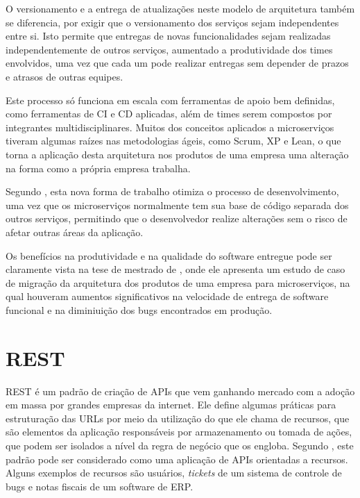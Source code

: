 O versionamento e a entrega de atualizações neste modelo de arquitetura
também se diferencia, por exigir que o versionamento dos serviços sejam
independentes entre si. Isto permite que entregas de novas funcionalidades
sejam realizadas independentemente de outros serviços, aumentado a
produtividade dos times envolvidos, uma vez que cada um pode realizar entregas
sem depender de prazos e atrasos de outras equipes.

Este processo só funciona em escala com ferramentas de apoio bem definidas,
como ferramentas de \ac{CI} e \ac{CD} aplicadas, além de times serem compostos
por integrantes multidisciplinares. Muitos dos conceitos aplicados a
microserviços tiveram algumas raízes nas metodologias ágeis, como Scrum, XP e
Lean, o que torna a aplicação desta arquitetura nos produtos de uma empresa
uma alteração na forma como a própria empresa trabalha.

Segundo , esta nova forma de trabalho otimiza o processo
de desenvolvimento, uma vez que os microserviços normalmente tem sua base de
código separada dos outros serviços, permitindo que o desenvolvedor realize
alterações sem o risco de afetar outras áreas da aplicação.

Os benefícios na produtividade e na qualidade do software entregue pode
ser claramente vista na tese de mestrado de , onde
ele apresenta um estudo de caso de migração da arquitetura dos produtos
de uma empresa para microserviços, na qual houveram aumentos significativos na
velocidade de entrega de software funcional e na diminiuição dos bugs
encontrados em produção.

\section{REST}

\ac{REST} é um padrão de criação de \ac{APIs} que vem ganhando mercado com a
adoção em massa por grandes empresas da internet. Ele define algumas práticas
para estruturação das \ac{URLs} por meio da utilização do que ele chama de
recursos, que são elementos da aplicação responsáveis por armazenamento ou
tomada de ações, que podem ser isolados a nível da regra de negócio que os
engloba. Segundo , este padrão pode ser considerado
como uma aplicação de \ac{APIs} orientadas a recursos. Alguns exemplos
de recursos são usuários, \emph{tickets} de um sistema de controle de bugs e
notas fiscais de um software de \ac{ERP}.

